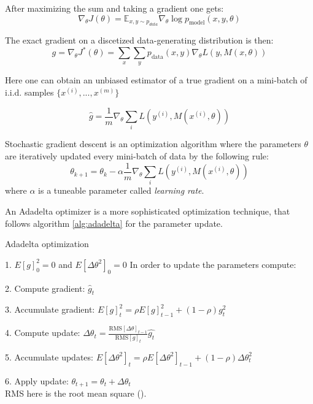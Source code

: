 After maximizing the sum and taking a gradient one gets:
\begin{equation}
	\nabla_{\theta} J(\theta) = \mathbb{E}_{x, y \sim p_{data}} \nabla_{\theta} \log{p_{\text{model}}(x, y, \theta)}
\end{equation}

The exact gradient on a discetized data-generating distribution is then:
\begin{equation}
	g = \nabla_{\theta} J^*(\theta) = \sum_{x} \sum_{y}{p_{\text{data}}(x, y) \nabla_{\theta} L(y, M(x, \theta))}
\end{equation}

Here one can obtain an unbiased estimator of a true gradient on a mini-batch of i.i.d. samples $\{x^{(i)}, ..., x^{(m)}\}$	

\begin{equation}
	\hat{g} = \frac{1}{m} \nabla_\theta \sum_{i} L(y^{(i)}, M(x^{(i)}, \theta))
\end{equation}

\begin{definition}
	Stochastic gradient descent is an optimization algorithm where the parameters $\theta$ are iteratively updated every mini-batch of data by the following rule:
	\begin{equation}
		\theta_{k+1} = \theta_k - \alpha \frac{1}{m} \nabla_\theta \sum_{i} L(y^{(i)}, M(x^{(i)}, \theta))
	\end{equation}
	where $\alpha$ is a tuneable parameter called \textit {learning rate}.
\end{definition}

\begin{definition}
	An Adadelta optimizer is a more sophisticated optimization technique, that follows algorithm \ref{alg:adadelta} for the parameter update.
	\begin{algorithm}
		\caption{Adadelta optimization}\label{alg:adadelta}
		\item 1. $E[g]^2_0 = 0$ and $E[\Delta \theta^2]_0 = 0$
		In order to update the parameters compute:
		\item 2. Compute gradient: $\hat{g}_t$
		\item 3. Accumulate gradient: $E[g]^2_t = \rho E[g]^2_{t - 1} + (1 - \rho)g_t^2$
		\item 4. Compute update: $\Delta \theta_t = \frac{\text{RMS}[\Delta \theta]_{t-1}}{\text{RMS}[g]_t} \hat{g_t}$
		\item 5. Accumulate updates: $E[\Delta \theta^2]_t = \rho E[\Delta \theta^2]_{t-1} + (1 - \rho) \Delta \theta^2_t$
		\item 6. Apply update: $\theta_{t+1} = \theta_t + \Delta \theta_t$ \\
		RMS here is the root mean square (\cite{Zeiler_2012}).
	\end{algorithm}
\end{definition}

